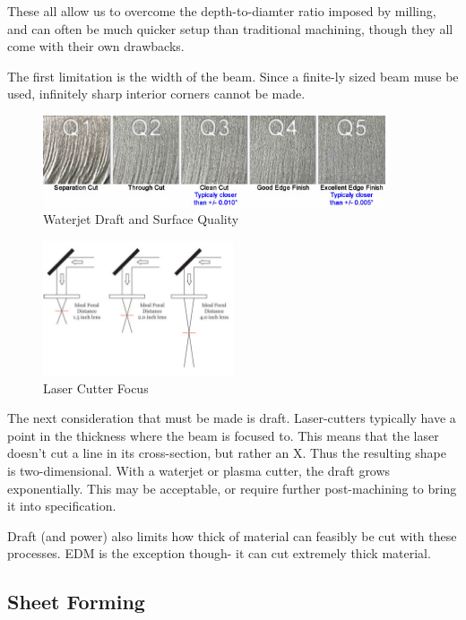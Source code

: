 \documentclass[10pt,letterpaper]{book}
\begin{document}
 	These all allow us to overcome the depth-to-diamter ratio imposed by milling, and can often be much quicker setup than traditional machining, though they all come with their own drawbacks.
 
 The first limitation is the width of the beam. Since a finite-ly sized beam muse be used, infinitely sharp interior corners cannot be made.
 
 \begin{figure}[H] \centering
 	\includegraphics[width=0.9\textwidth]{imgs/waterjet_draft.jpeg}
 	\caption{Waterjet Draft and Surface Quality}
 \end{figure}
 
 \begin{figure}[H] \centering
 	\includegraphics[width=0.5\textwidth]{imgs/lasercut_focus.jpeg}
 	\caption{Laser Cutter Focus}
 \end{figure}
 
 The next consideration that must be made is draft. Laser-cutters typically have a point in the thickness where the beam is focused to. This means that the laser doesn't cut a line in its cross-section, but rather an X. Thus the resulting shape is two-dimensional. With a waterjet or plasma cutter, the draft grows exponentially. This may be acceptable, or require further post-machining to bring it into specification.
 
 Draft (and power) also limits how thick of material can feasibly be cut with these processes. EDM is the exception though- it can cut extremely thick material.
 
 \subsection{Sheet Forming}
 
\end{document}
